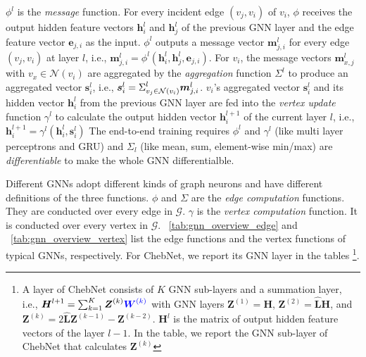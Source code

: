 $\phi^l$ is the \emph{message} function.
For every incident edge $(v_j, v_i)$ of $v_i$, $\phi$ receives the output hidden feature vectors $\boldsymbol{h}^l_i$ and $\boldsymbol{h}^l_j$ of the previous GNN layer and the edge feature vector $\boldsymbol{e}_{j,i}$ as the input.
$\phi^l$ outputs a message vector $\boldsymbol{m}^l_{j,i}$ for every edge $(v_j, v_i)$ at layer $l$, i.e., $\boldsymbol{m}^l_{j,i}=\phi^l(\boldsymbol{h}^l_i, \boldsymbol{h}^l_j, \boldsymbol{e}_{j,i})$.
For $v_i$, the message vectors $\boldsymbol{m}^l_{x,j}$ with $v_x \in \mathcal{N}(v_i)$ are aggregated by the \emph{aggregation} function $\Sigma^l$ to produce an aggregated vector $\boldsymbol{s}^l_i$, i.e., $\boldsymbol{s}^l_i=\mathlarger{\Sigma}^l_{v_j \in \mathcal{N}(v_i)}\boldsymbol{m}^l_{j,i}$.
$v_i$'s aggregated vector $\boldsymbol{s}^l_i$ and its hidden vector $\boldsymbol{h}^l_i$ from the previous GNN layer are fed into the \emph{vertex update} function $\gamma^l$ to calculate the output hidden vector $\boldsymbol{h}^{l+1}_i$ of the current layer $l$, i.e., $\boldsymbol{h}^{l+1}_i = \gamma^l(\boldsymbol{h}^l_i, \boldsymbol{s}^l_i)$
The end-to-end training requires $\phi^l$ and $\gamma^l$ (like multi layer perceptrons and GRU) and $\Sigma_l$ (like mean, sum, element-wise min/max) are \emph{differentiable} to make the whole GNN differentialble.

Different GNNs adopt different kinds of graph neurons and have different definitions of the three functions.
$\phi$ and $\Sigma$ are the \emph{edge computation} functions.
They are conducted over every edge in $\mathcal{G}$.
$\gamma$ is the \emph{vertex computation} function.
It is conducted over every vertex in $\mathcal{G}$.
\tablename~\ref{tab:gnn_overview_edge} and \tablename~\ref{tab:gnn_overview_vertex} list the edge functions and the vertex functions of typical GNNs, respectively.
For ChebNet, we report its GNN layer in the tables \footnote{A layer of ChebNet consists of $K$ GNN sub-layers and a summation layer, i.e., $\boldsymbol{H}^{l+1} = \sum_{k=1}^K{\boldsymbol{Z}^{(k)} \textcolor{blue}{\boldsymbol{W}^{(k)}}}$ with GNN layers $\boldsymbol{Z}^{(1)}=\boldsymbol{H}$, $\boldsymbol{Z}^{(2)}=\hat{\boldsymbol{L}}\boldsymbol{H}$, and $\boldsymbol{Z}^{(k)}=2\hat{\boldsymbol{L}}\boldsymbol{Z}^{(k-1)} - \boldsymbol{Z}^{(k-2)}$. $\boldsymbol{H}^l$ is the matrix of output hidden feature vectors of the layer $l-1$. In the table, we report the GNN sub-layer of ChebNet that calculates $\boldsymbol{Z}^{(k)}$}.

